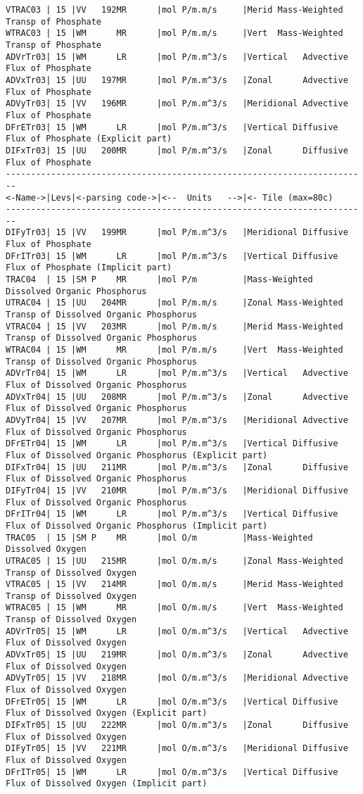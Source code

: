 {\begin{verbatim}
VTRAC03 | 15 |VV   192MR      |mol P/m.m/s     |Merid Mass-Weighted Transp of Phosphate
WTRAC03 | 15 |WM      MR      |mol P/m.m/s     |Vert  Mass-Weighted Transp of Phosphate
ADVrTr03| 15 |WM      LR      |mol P/m.m^3/s   |Vertical   Advective Flux of Phosphate
ADVxTr03| 15 |UU   197MR      |mol P/m.m^3/s   |Zonal      Advective Flux of Phosphate
ADVyTr03| 15 |VV   196MR      |mol P/m.m^3/s   |Meridional Advective Flux of Phosphate
DFrETr03| 15 |WM      LR      |mol P/m.m^3/s   |Vertical Diffusive Flux of Phosphate (Explicit part)
DIFxTr03| 15 |UU   200MR      |mol P/m.m^3/s   |Zonal      Diffusive Flux of Phosphate
------------------------------------------------------------------------
<-Name->|Levs|<-parsing code->|<--  Units   -->|<- Tile (max=80c) 
------------------------------------------------------------------------
DIFyTr03| 15 |VV   199MR      |mol P/m.m^3/s   |Meridional Diffusive Flux of Phosphate
DFrITr03| 15 |WM      LR      |mol P/m.m^3/s   |Vertical Diffusive Flux of Phosphate (Implicit part)
TRAC04  | 15 |SM P    MR      |mol P/m         |Mass-Weighted Dissolved Organic Phosphorus
UTRAC04 | 15 |UU   204MR      |mol P/m.m/s     |Zonal Mass-Weighted Transp of Dissolved Organic Phosphorus
VTRAC04 | 15 |VV   203MR      |mol P/m.m/s     |Merid Mass-Weighted Transp of Dissolved Organic Phosphorus
WTRAC04 | 15 |WM      MR      |mol P/m.m/s     |Vert  Mass-Weighted Transp of Dissolved Organic Phosphorus
ADVrTr04| 15 |WM      LR      |mol P/m.m^3/s   |Vertical   Advective Flux of Dissolved Organic Phosphorus
ADVxTr04| 15 |UU   208MR      |mol P/m.m^3/s   |Zonal      Advective Flux of Dissolved Organic Phosphorus
ADVyTr04| 15 |VV   207MR      |mol P/m.m^3/s   |Meridional Advective Flux of Dissolved Organic Phosphorus
DFrETr04| 15 |WM      LR      |mol P/m.m^3/s   |Vertical Diffusive Flux of Dissolved Organic Phosphorus (Explicit part)
DIFxTr04| 15 |UU   211MR      |mol P/m.m^3/s   |Zonal      Diffusive Flux of Dissolved Organic Phosphorus
DIFyTr04| 15 |VV   210MR      |mol P/m.m^3/s   |Meridional Diffusive Flux of Dissolved Organic Phosphorus
DFrITr04| 15 |WM      LR      |mol P/m.m^3/s   |Vertical Diffusive Flux of Dissolved Organic Phosphorus (Implicit part)
TRAC05  | 15 |SM P    MR      |mol O/m         |Mass-Weighted Dissolved Oxygen
UTRAC05 | 15 |UU   215MR      |mol O/m.m/s     |Zonal Mass-Weighted Transp of Dissolved Oxygen
VTRAC05 | 15 |VV   214MR      |mol O/m.m/s     |Merid Mass-Weighted Transp of Dissolved Oxygen
WTRAC05 | 15 |WM      MR      |mol O/m.m/s     |Vert  Mass-Weighted Transp of Dissolved Oxygen
ADVrTr05| 15 |WM      LR      |mol O/m.m^3/s   |Vertical   Advective Flux of Dissolved Oxygen
ADVxTr05| 15 |UU   219MR      |mol O/m.m^3/s   |Zonal      Advective Flux of Dissolved Oxygen
ADVyTr05| 15 |VV   218MR      |mol O/m.m^3/s   |Meridional Advective Flux of Dissolved Oxygen
DFrETr05| 15 |WM      LR      |mol O/m.m^3/s   |Vertical Diffusive Flux of Dissolved Oxygen (Explicit part)
DIFxTr05| 15 |UU   222MR      |mol O/m.m^3/s   |Zonal      Diffusive Flux of Dissolved Oxygen
DIFyTr05| 15 |VV   221MR      |mol O/m.m^3/s   |Meridional Diffusive Flux of Dissolved Oxygen
DFrITr05| 15 |WM      LR      |mol O/m.m^3/s   |Vertical Diffusive Flux of Dissolved Oxygen (Implicit part)


\end{verbatim}}
